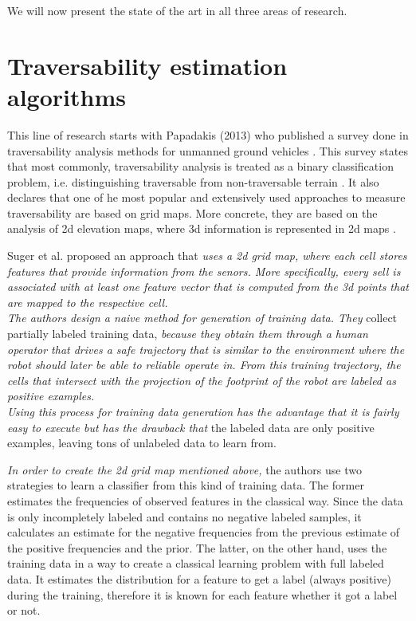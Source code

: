 \documentclass[12pt,a4paper]{report}
\begin{document}
	We will now present the state of the art in all three areas of research.
	\\
	
	\section{Traversability estimation algorithms}
	\label{sec:bg:trav}
	
	This line of research starts with Papadakis (2013) who published a 
	survey done in traversability analysis methods for unmanned ground vehicles 
	\cite{Papadakis}. This survey states that most commonly, traversability analysis is treated 
	as a binary classification problem, i.e. distinguishing traversable from 
	non-traversable terrain \cite{Suger, Hirose, Wigness}. It also declares that one of he most popular and extensively used approaches 
	to measure traversability are based on grid 
	maps. More concrete, they are based on the analysis of 2d elevation maps, 
	where 3d information is represented in 2d maps \cite{Suger}.
	\newline
	
	Suger et al. \cite{Suger} proposed an approach that \textit{uses a 2d grid map, where 
	each cell stores features that provide information from the senors. More 
	specifically, every sell is associated with at least one feature vector that is 
	computed from the 3d points that are mapped to the respective cell.
	\\
	The authors design a naive method for generation of training data. They} 
	collect partially labeled training data, \textit{because they obtain them through a 
	human operator that drives a safe trajectory that is similar to the 
	environment where the robot should later be able to reliable operate	in. From this 
	training trajectory, the cells that intersect with the projection of the footprint 
	of the robot are labeled as positive examples. 
	\\
	Using this process for training data generation has the advantage that it 
	is fairly easy to execute but has the drawback that} the labeled data are only 
	positive examples, leaving tons of unlabeled data to learn from.
	
	\textit{In order to create the 2d grid map mentioned above,} the authors use two strategies to learn a classifier from this kind of 
	training data. The former estimates the frequencies of observed	features in the 
	classical way. Since the data is only incompletely labeled and contains no 
	negative labeled samples, it calculates an estimate for the negative 
	frequencies from the previous estimate of the positive frequencies and the prior. The 
	latter, on the other hand, uses the training data in a way to create a classical 
	learning problem with full labeled data. It estimates the distribution for a 
	feature to get a label (always positive) during the training, therefore it is 
	known for each feature whether it got a label or not.
	\newline
	
\end{document}

